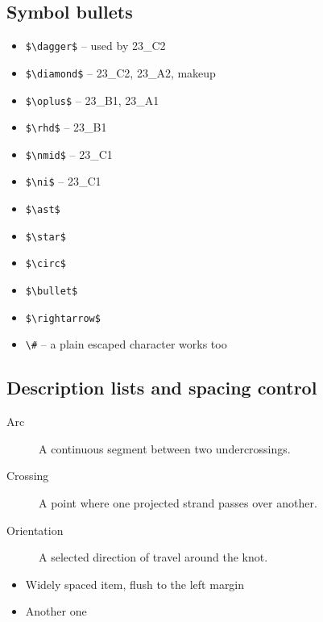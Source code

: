 \documentclass[11pt,a4paper]{article}
\theoremstyle{definition}                   %
\begin{document}
\subsection{Symbol bullets}
\begin{itemize}
    \item[$\dagger$]     \verb|$\dagger$|     -- used by 23\_C2
    \item[$\diamond$]    \verb|$\diamond$|    -- 23\_C2, 23\_A2, makeup
    \item[$\oplus$]      \verb|$\oplus$|      -- 23\_B1, 23\_A1
    \item[$\rhd$]        \verb|$\rhd$|        -- 23\_B1
    \item[$\nmid$]       \verb|$\nmid$|       -- 23\_C1
    \item[$\ni$]         \verb|$\ni$|         -- 23\_C1
    \item[$\ast$]        \verb|$\ast$|
    \item[$\star$]       \verb|$\star$|
    \item[$\circ$]       \verb|$\circ$|
    \item[$\bullet$]     \verb|$\bullet$|
    \item[$\rightarrow$] \verb|$\rightarrow$|
    \item[\#]            \verb|\#| -- a plain escaped character works too
\end{itemize}

\subsection{Description lists and spacing control}

\begin{description}
    \item[Arc] A continuous segment between two undercrossings.
    \item[Crossing] A point where one projected strand passes over another.
    \item[Orientation] A selected direction of travel around the knot.
\end{description}

\begin{itemize}[leftmargin=*, itemsep=0.6em, topsep=0pt]
    \item Widely spaced item, flush to the left margin
    \item Another one
\end{itemize}
\end{document}

